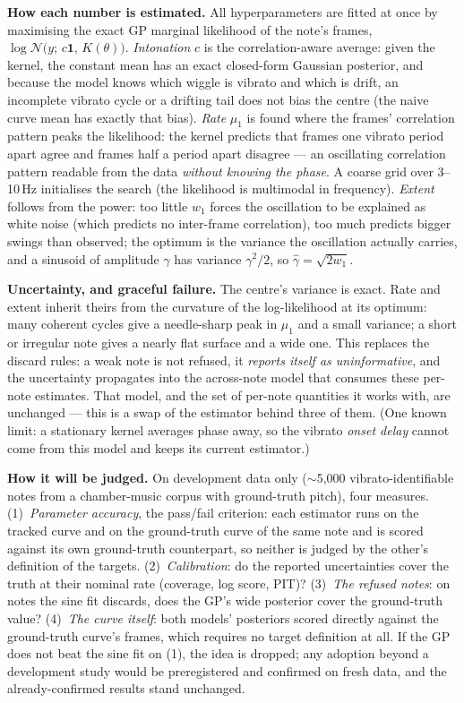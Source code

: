 \documentclass[10pt,a4paper]{article}
\begin{document}
\textbf{How each number is estimated.}
All hyperparameters are fitted at once by maximising the exact GP marginal
likelihood of the note's frames,
$\log \mathcal{N}\!\bigl(y;\, c\mathbf{1},\, K(\theta)\bigr)$.
\emph{Intonation} $c$ is the correlation-aware average: given the kernel, the
constant mean has an exact closed-form Gaussian posterior, and because the model
knows which wiggle is vibrato and which is drift, an incomplete vibrato cycle or
a drifting tail does not bias the centre (the naive curve mean has exactly that
bias). \emph{Rate} $\mu_1$ is found where the frames' correlation pattern peaks
the likelihood: the kernel predicts that frames one vibrato period apart agree
and frames half a period apart disagree --- an oscillating correlation pattern
readable from the data \emph{without knowing the phase}. A coarse grid over
3--10\,Hz initialises the search (the likelihood is multimodal in frequency).
\emph{Extent} follows from the power: too little $w_1$ forces the oscillation to
be explained as white noise (which predicts no inter-frame correlation), too
much predicts bigger swings than observed; the optimum is the variance the
oscillation actually carries, and a sinusoid of amplitude $\gamma$ has variance
$\gamma^2/2$, so $\hat\gamma = \sqrt{2 w_1}$.

\textbf{Uncertainty, and graceful failure.}
The centre's variance is exact. Rate and extent inherit theirs from the
curvature of the log-likelihood at its optimum: many coherent cycles give a
needle-sharp peak in $\mu_1$ and a small variance; a short or irregular note
gives a nearly flat surface and a wide one. This replaces the discard rules: a
weak note is not refused, it \emph{reports itself as uninformative}, and the
uncertainty propagates into the across-note model that consumes these per-note
estimates. That model, and the set of per-note quantities it works with, are
unchanged --- this is a swap of the estimator behind three of them. (One known
limit: a stationary kernel averages phase away, so the vibrato \emph{onset
delay} cannot come from this model and keeps its current estimator.)

\textbf{How it will be judged.}
On development data only ($\sim$5{,}000 vibrato-identifiable notes from a
chamber-music corpus with ground-truth pitch), four measures. (1)~\emph{Parameter
accuracy}, the pass/fail criterion: each estimator runs on the tracked curve and
on the ground-truth curve of the same note and is scored against its own
ground-truth counterpart, so neither is judged by the other's definition of the
targets. (2)~\emph{Calibration}: do the reported uncertainties cover the truth
at their nominal rate (coverage, log score, PIT)? (3)~\emph{The refused notes}:
on notes the sine fit discards, does the GP's wide posterior cover the
ground-truth value? (4)~\emph{The curve itself}: both models' posteriors scored
directly against the ground-truth curve's frames, which requires no target
definition at all. If the GP does not beat the sine fit on (1), the idea is
dropped; any adoption beyond a development study would be preregistered and
confirmed on fresh data, and the already-confirmed results stand unchanged.
\end{document}
